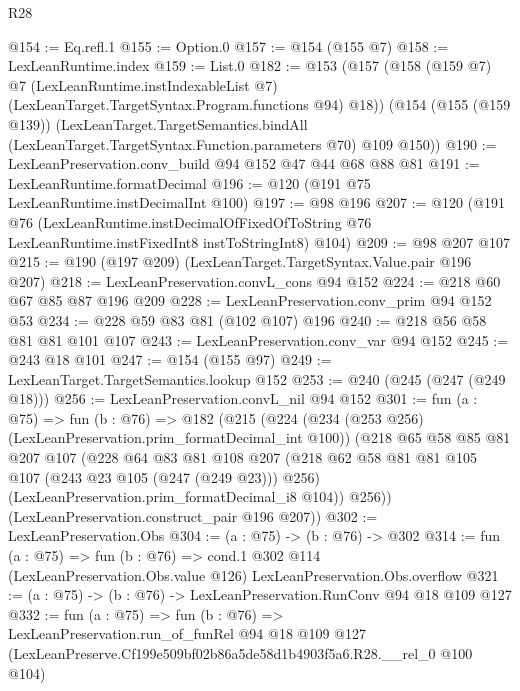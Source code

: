\begin{lexlean}{R28}
\begin{coremodule}
@154 := Eq.refl.{1}
@155 := Option.{0}
@157 := @154 (@155 @7)
@158 := LexLeanRuntime.index
@159 := List.{0}
@182 := @153
    (@157
      (@158
        (@159 @7)
        @7
        (LexLeanRuntime.instIndexableList @7)
        (LexLeanTarget.TargetSyntax.Program.functions @94)
        @18))
    (@154
      (@155 (@159 @139))
      (LexLeanTarget.TargetSemantics.bindAll
        (LexLeanTarget.TargetSyntax.Function.parameters @70)
        @109
        @150))
@190 := LexLeanPreservation.conv_build @94 @152 @47 @44 @68 @88 @81
@191 := LexLeanRuntime.formatDecimal
@196 := @120 (@191 @75 LexLeanRuntime.instDecimalInt @100)
@197 := @98 @196
@207 := @120
    (@191
      @76
      (LexLeanRuntime.instDecimalOfFixedOfToString
        @76
        LexLeanRuntime.instFixedInt8
        instToStringInt8)
      @104)
@209 := @98 @207 @107
@215 := @190 (@197 @209) (LexLeanTarget.TargetSyntax.Value.pair @196 @207)
@218 := LexLeanPreservation.convL_cons @94 @152
@224 := @218 @60 @67 @85 @87 @196 @209
@228 := LexLeanPreservation.conv_prim @94 @152 @53
@234 := @228 @59 @83 @81 (@102 @107) @196
@240 := @218 @56 @58 @81 @81 @101 @107
@243 := LexLeanPreservation.conv_var @94 @152
@245 := @243 @18 @101
@247 := @154 (@155 @97)
@249 := LexLeanTarget.TargetSemantics.lookup @152
@253 := @240 (@245 (@247 (@249 @18)))
@256 := LexLeanPreservation.convL_nil @94 @152
@301 := fun (a : @75) =>
  fun (b : @76) =>
  @182
    (@215
      (@224
        (@234 (@253 @256) (LexLeanPreservation.prim_formatDecimal_int @100))
        (@218
          @65
          @58
          @85
          @81
          @207
          @107
          (@228
            @64
            @83
            @81
            @108
            @207
            (@218 @62 @58 @81 @81 @105 @107 (@243 @23 @105 (@247 (@249 @23))) @256)
            (LexLeanPreservation.prim_formatDecimal_i8 @104))
          @256))
      (LexLeanPreservation.construct_pair @196 @207))
@302 := LexLeanPreservation.Obs
@304 := (a : @75) -> (b : @76) -> @302
@314 := fun (a : @75) =>
  fun (b : @76) =>
  cond.{1} @302 @114 (LexLeanPreservation.Obs.value @126) LexLeanPreservation.Obs.overflow
@321 := (a : @75) -> (b : @76) -> LexLeanPreservation.RunConv @94 @18 @109 @127
@332 := fun (a : @75) =>
  fun (b : @76) =>
  LexLeanPreservation.run_of_funRel
    @94
    @18
    @109
    @127
    (LexLeanPreserve.Cf199e509bf02b86a5de58d1b4903f5a6.R28.__rel_0 @100 @104)
\end{coremodule}
\end{lexlean}
